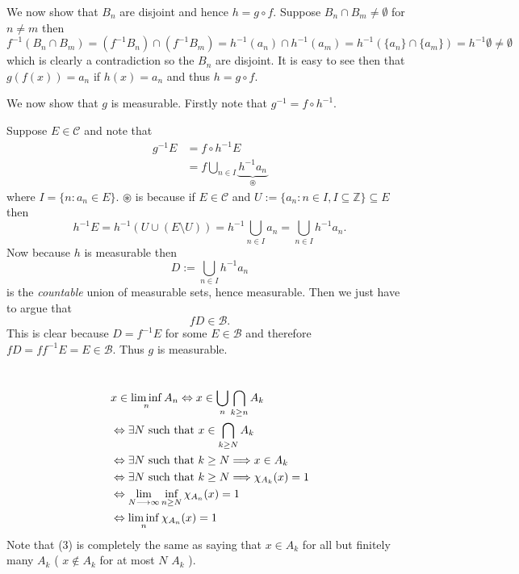 \documentclass{unswmaths}
\begin{document}
We now show that $ B_n $ are disjoint and hence $ h = g \circ f $. Suppose $ B_n \cap B_m \neq \emptyset $ for $ n \neq m $ then 
$$ f^{-1} (B_n \cap B_m) = (f^{-1} B_n) \cap (f^{-1} B_m) = h^{-1}(a_n) \cap h^{-1}(a_m) = h^{-1}( \{a_n\} \cap \{a_m\} ) = h^{-1} \emptyset \neq \emptyset $$
which is clearly a contradiction so the $ B_n $ are disjoint. It is easy to see then that $ g(f(x)) = a_n $ if $ h(x) = a_n $ and thus $ h = g \circ f $.

We now show that $ g $ is measurable. Firstly note that $ g^{-1} = f \circ h^{-1} $.

Suppose $ E \in \mathcal{C} $ and note that
\begin{align*}
g^{-1}E &= f \circ h^{-1} E \\
&= f \bigcup_{n \in I} \underbrace{h^{-1} a_n}_{\circledast}
\end{align*}
where $ I = \{ n : a_n \in E \} $.
$ \circledast $ is because if $ E \in \mathcal{C} $ and $ U := \{ a_n : n \in I, I \subseteq \mathbb{Z} \} \subseteq E $ then
$$ h^{-1} E = h^{-1} \left(U \cup \left(E \setminus U \right)\right) = h^{-1} \bigcup_{n\in I} a_n = \bigcup_{n \in I} h^{-1} a_n. $$
Now because $ h $ is measurable then
$$
D := \bigcup_{n \in I} h^{-1}a_n
$$
is the \emph{countable} union of measurable sets, hence measurable.
Then we just have to argue that
$$
fD \in \mathcal{B}.
$$
This is clear because $ D = f^{-1} E $ for some $ E \in \mathcal{B} $ and therefore $ fD = ff^{-1}E = E \in \mathcal{B} $.
Thus $ g $ is measurable.
\section{}
\subsection{}
\begin{align}
    & x \in \liminf_n A_n \Leftrightarrow x \in \bigcup_n \bigcap_{k\geq n} A_k \\
    & \Leftrightarrow \exists N \text{ such that } x \in \bigcap_{k\geq N} A_k \\
    & \Leftrightarrow \exists N \text{ such that } k \geq N \Longrightarrow x \in A_k \\
    & \Leftrightarrow \exists N \text{ such that } k \geq N \Longrightarrow \chi_{A_k}(x) = 1 \\
    & \Leftrightarrow \lim_{N \longrightarrow \infty} \inf_{n \geq N} \chi_{A_n}(x) = 1 \\
    & \Leftrightarrow \liminf_{n} \chi_{A_n}(x) = 1
\end{align}
Note that (3) is completely the same as saying that $ x \in A_k $ for all but finitely many $ A_k $ ( $ x \not\in A_k $ for at most $ N $ $ A_k $ ).
\end{document}
